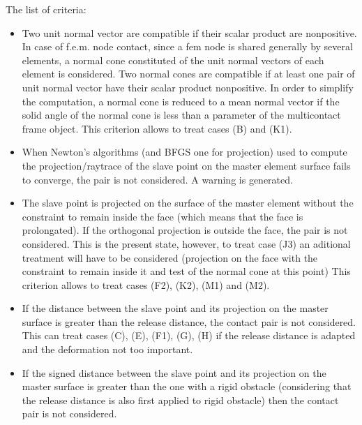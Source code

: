\documentclass[a4paper,11pt,english]{sphinxmanual}
\begin{document}
The list of criteria:
\begin{itemize}
\item {} 
Two unit normal vector are compatible if their scalar product are
non\sphinxhyphen{}positive. In case of f.e.m. node contact, since a fem node is shared
generally by several elements, a normal cone constituted of the unit normal
vectors of each element is considered. Two normal cones are compatible if
at least one pair of unit normal vector have their scalar product
non\sphinxhyphen{}positive. In order to simplify the computation, a normal cone is
reduced to a mean normal vector if the solid angle of the normal cone is
less than  a parameter of the multi\sphinxhyphen{}contact frame object.
This criterion allows to treat cases (B) and (K1).

\item {} 
When Newton’s algorithms (and BFGS one for projection) used to compute the
projection/raytrace of the slave point on the master element surface
fails to converge, the pair is not considered. A warning is generated.

\item {} 
The slave point is projected on the surface of the master element
without the constraint to remain inside the face
(which means that the face is prolongated). If the orthogonal
projection is outside the face, the pair is not considered. This
is the present state, however, to treat case (J3) an aditional
treatment will have to be considered (projection on the face with
the constraint to remain inside it and test of the normal cone at
this point)
This criterion allows to treat cases (F2), (K2), (M1) and (M2).

\item {} 
If the distance between the slave point and its projection on the master
surface is greater than the release distance, the contact pair is not
considered. This can treat cases (C), (E), (F1), (G), (H) if the release
distance is adapted and the deformation not too important.

\item {} 
If the signed distance between the slave point and its projection on
the master surface is greater than the one with a rigid obstacle
(considering that the release distance is also first applied to rigid
obstacle) then the contact pair is not considered.


\end{itemize}
\end{document}
